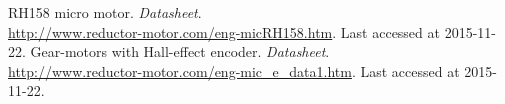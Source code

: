 \documentclass[11pt]{article}
\begin{document}
\begin{thebibliography}{99}
 {RH158 micro motor}. \emph{Datasheet}. \\ \url{http://www.reductor-motor.com/eng-micRH158.htm}. Last accessed at 2015-11-22.
 {Gear-motors with Hall-effect encoder}. \emph{Datasheet}. \\ \url{http://www.reductor-motor.com/eng-mic_e_data1.htm}. Last accessed at 2015-11-22.
\end{thebibliography}
\end{document}
